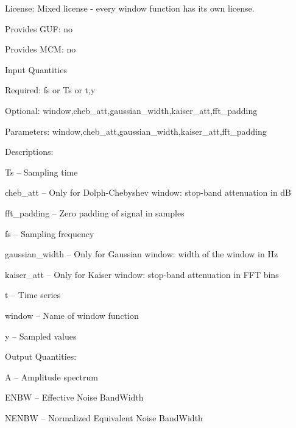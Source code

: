 \begin{tightdesc}
\item [License:] Mixed license - every window function has its own license.
\item [Provides GUF:] no
\item [Provides MCM:] no
\item [Input Quantities] \rule{0em}{0em}
    \begin{tightdesc}
    \item [Required:] 
        \textsf{fs} or \textsf{Ts} or \textsf{t},\enspace \textsf{y}
    \item [Optional:] 
        \textsf{window},\enspace \textsf{cheb\_att},\enspace \textsf{gaussian\_width},\enspace \textsf{kaiser\_att},\enspace \textsf{fft\_padding}
    \item [Parameters:] 
        \textsf{window},\enspace \textsf{cheb\_att},\enspace \textsf{gaussian\_width},\enspace \textsf{kaiser\_att},\enspace \textsf{fft\_padding}
    \item [Descriptions:] \rule{0em}{0em}
        \begin{tightdesc}
            \item[\textsf{Ts}] -- Sampling time
            \item[\textsf{cheb\_att}] -- Only for Dolph-Chebyshev window: stop-band attenuation in dB
            \item[\textsf{fft\_padding}] -- Zero padding of signal in samples
            \item[\textsf{fs}] -- Sampling frequency
            \item[\textsf{gaussian\_width}] -- Only for Gaussian window: width of the window in Hz
            \item[\textsf{kaiser\_att}] -- Only for Kaiser window: stop-band attenuation in FFT bins
            \item[\textsf{t}] -- Time series
            \item[\textsf{window}] -- Name of window function
            \item[\textsf{y}] -- Sampled values
        \end{tightdesc}
    \end{tightdesc}
\item [Output Quantities:] \rule{0em}{0em}
    \begin{tightdesc}
        \item[\textsf{A}] -- Amplitude spectrum
        \item[\textsf{ENBW}] -- Effective Noise BandWidth
        \item[\textsf{NENBW}] -- Normalized Equivalent Noise BandWidth

\end{tightdesc}
\end{tightdesc}
